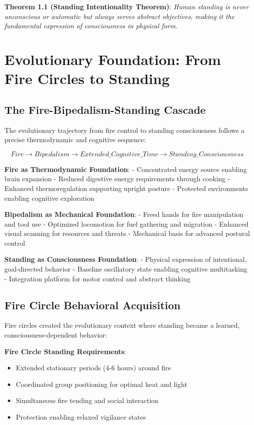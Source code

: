 \documentclass[12pt]{article}
\begin{document}
\textbf{Theorem 1.1 (Standing Intentionality Theorem)}: \emph{Human standing is never unconscious or automatic but always serves abstract objectives, making it the fundamental expression of consciousness in physical form.}

\section{Evolutionary Foundation: From Fire Circles to Standing}

\subsection{The Fire-Bipedalism-Standing Cascade}

The evolutionary trajectory from fire control to standing consciousness follows a precise thermodynamic and cognitive sequence:

$$Fire \rightarrow Bipedalism \rightarrow Extended\_Cognitive\_Time \rightarrow Standing\_Consciousness$$

\textbf{Fire as Thermodynamic Foundation}:
- Concentrated energy source enabling brain expansion
- Reduced digestive energy requirements through cooking
- Enhanced thermoregulation supporting upright posture
- Protected environments enabling cognitive exploration

\textbf{Bipedalism as Mechanical Foundation}:
- Freed hands for fire manipulation and tool use
- Optimized locomotion for fuel gathering and migration
- Enhanced visual scanning for resources and threats
- Mechanical basis for advanced postural control

\textbf{Standing as Consciousness Foundation}:
- Physical expression of intentional, goal-directed behavior
- Baseline oscillatory state enabling cognitive multitasking
- Integration platform for motor control and abstract thinking

\subsection{Fire Circle Behavioral Acquisition}

Fire circles created the evolutionary context where standing became a learned, consciousness-dependent behavior:

\textbf{Fire Circle Standing Requirements}:
\begin{itemize}
\item Extended stationary periods (4-6 hours) around fire
\item Coordinated group positioning for optimal heat and light
\item Simultaneous fire tending and social interaction
\item Protection enabling relaxed vigilance states
\end{itemize}
\end{document}
